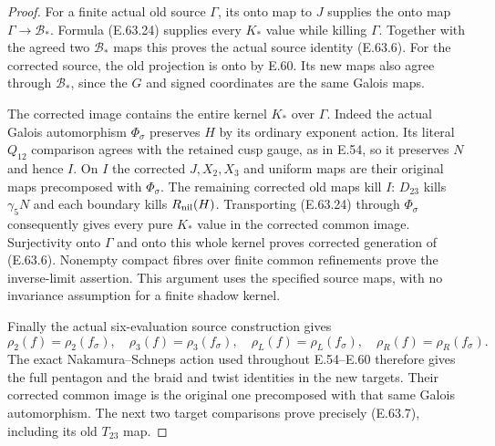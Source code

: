 \begin{proof}
For a finite actual old source $\Gamma$, its onto
map to $J$ supplies the onto map
$\Gamma\to\mathcal B_*$. Formula
\textup{(E.63.24)} supplies every $K_*$ value while
killing $\Gamma$. Together with the agreed two
$\mathcal B_*$ maps this proves the actual source
identity \textup{(E.63.6)}. For the corrected source,
the old projection is onto by E.60. Its new maps
also agree through $\mathcal B_*$, since the $G$
and signed coordinates are the same Galois maps.

The corrected image contains the entire kernel
$K_*$ over $\Gamma$. Indeed the actual Galois
automorphism $\Phi_\sigma$ preserves $H$ by its
ordinary exponent action. Its literal $Q_{12}$
comparison agrees with the retained cusp gauge,
as in E.54, so it preserves $N$ and hence $I$.
On $I$ the corrected $J,X_2,X_3$ and uniform
maps are their original maps precomposed with
$\Phi_\sigma$. The remaining corrected old maps
kill $I$: $D_{23}$ kills $\gamma_5N$ and each
boundary kills $R_{\rm nil}(H)$. Transporting
\textup{(E.63.24)} through $\Phi_\sigma$ consequently
gives every pure $K_*$ value in the corrected
common image. Surjectivity onto $\Gamma$ and onto
this whole kernel proves corrected generation of
\textup{(E.63.6)}. Nonempty compact fibres over
finite common refinements prove the inverse-limit
assertion. This argument uses the specified source
maps, with no invariance assumption for a finite
shadow kernel.

Finally the actual six-evaluation source construction
gives
\[
 \rho_2(f)=\rho_2(f_\sigma),\quad
 \rho_3(f)=\rho_3(f_\sigma),\quad
 \rho_L(f)=\rho_L(f_\sigma),\quad
 \rho_R(f)=\rho_R(f_\sigma).
 \tag{E.63.26}
\]
The exact Nakamura--Schneps action used throughout
E.54--E.60 therefore gives the full pentagon and
the braid and twist identities in the new targets.
Their corrected common image is the original one
precomposed with that same Galois automorphism.
The next two target comparisons prove precisely
\textup{(E.63.7)}, including its old $T_{23}$ map.


\end{proof}
